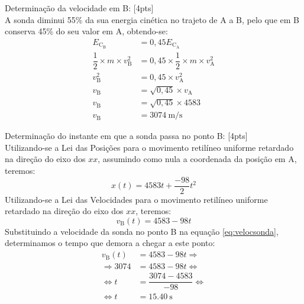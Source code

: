 \documentclass[addpoints]{exam}
\begin{document}
\begin{questions}
\begin{parts}
\begin{solution}
{					Determinação da velocidade em B: [4pts]\\
					A sonda diminui 55\% da sua energia cinética no trajeto de A a B, pelo que em B conserva 45\% do seu valor em A, obtendo-se:\\
					\begin{align*}
						E_{\text{C}_\text{B}} &= 0,45 E_{\text{C}_\text{A}}\\
						\dfrac{1}{2} \times m \times v_\text{B}^2 &= 0,45 \times \dfrac{1}{2} \times m \times v_\text{A}^2\\
						v_\text{B}^2 &= 0,45 \times v_\text{A}^2 \\
						v_\text{B} &= \sqrt{0,45} \times v_\text{A}\\
						v_\text{B} &= \sqrt{0,45} \times 4583\\
						v_\text{B} &= \SI{3074}{\meter\per\second}
					\end{align*}
					
					Determinação do instante em que a sonda passa no ponto B: [4pts]\\
					Utilizando-se a Lei das Posições para o movimento retilíneo uniforme retardado na direção do eixo dos $xx$, assumindo como nula a coordenada da posição em A, teremos:\\
					\begin{equation}
						x(t) = 4583 t + \dfrac{-98}{2} t^2
						\label{eq:possonda}
					\end{equation}
					Utilizando-se a Lei das Velocidades para o movimento retilíneo uniforme retardado na direção do eixo	dos $xx$, teremos:\\
					\begin{equation}
						v_\text{B}(t) = 4583 - 98 t
						\label{eq:velocsonda}
					\end{equation}
					Substituindo a velocidade da sonda no ponto B na equação \ref{eq:velocsonda}, determinamos o tempo que demora a chegar a este ponto:\\
					\begin{align*}
						v_\text{B}(t) &= 4583 - 98 t \Rightarrow \\
						\Rightarrow 3074 &= 4583 -98 t \Leftrightarrow \\
						\Leftrightarrow t &= \dfrac{3074-4583}{-98} \Leftrightarrow \\
						\Leftrightarrow t &= \SI{15,40}{\second}
					\end{align*}
					
}
\end{solution}
\end{parts}
\end{questions}
\end{document}
